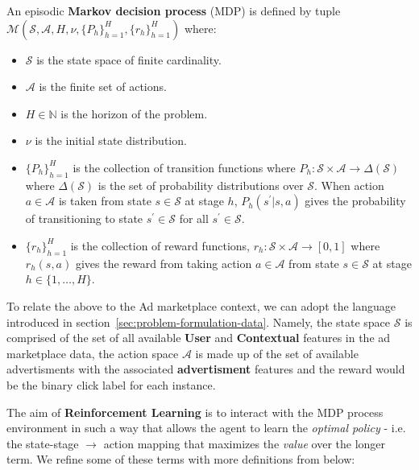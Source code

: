 \documentclass{mldsmsc}
\begin{document}
\begin{definition}\label{def:mdp}
    An episodic \textbf{Markov decision process} (MDP) is defined by tuple $\mathcal{M}
    (\mathcal{S},\mathcal{A}, H,\nu, \{P_{h}\}_{h=1}^{H},\{r_{h}\}_{h=1}^{H})$ where:
    \begin{itemize}
        \item $\mathcal{S}$ is the state space of finite cardinality.
        \item $\mathcal{A}$ is the finite set of actions.
        \item $H \in \mathbb{N}$ is the horizon of the problem.
        \item $\nu$ is the initial state distribution.
        \item $\{P_{h}\}_{h=1}^{H}$ is the collection of transition functions where
        $P_h: \mathcal{S} \times \mathcal{A} \rightarrow \Delta(\mathcal{S})$
        where $\Delta(\mathcal{S})$ is the set of probability distributions over
        $\mathcal{S}$. When action $a \in \mathcal{A}$ is taken from state $s \in \mathcal{S}$
        at stage $h$, $P_h(s^\prime | s, a)$ gives the probability of transitioning to state
        $s^\prime \in \mathcal{S}$ for all $s^\prime \in \mathcal{S}$.
        \item $\{r_{h}\}_{h=1}^{H}$ is the collection of reward functions, $r_h : \mathcal{S} \times \mathcal{A} \rightarrow [0,1]$
        where $r_h(s,a)$ gives the reward from taking action $a \in \mathcal{A}$ from state $s \in \mathcal{S}$
        at stage $h \in \{1, \ldots, H\}$.
    \end{itemize}
\end{definition}

To relate the above to the Ad marketplace context, we can adopt the language introduced in
section~\ref{sec:problem-formulation-data}. Namely, the state space $\mathcal{S}$ is comprised
of the set of all available \textbf{User} and \textbf{Contextual} features in the ad marketplace
data, the action space $\mathcal{A}$ is made up of the set of available advertisments with the
associated \textbf{advertisment} features and the reward would be the binary click label
for each instance.

The aim of \textbf{Reinforcement Learning} is to interact with the MDP process environment in such a way
that allows the agent to learn the \emph{optimal policy} - i.e. the state-stage $\rightarrow$ action mapping
that maximizes the \emph{value} over the longer term. We refine some of these terms with more definitions
from \citep{pike-burke2024LearnigAgents} below:
\end{document}
